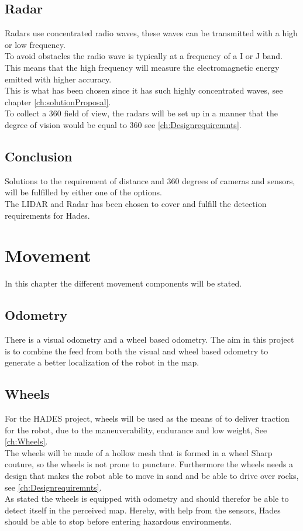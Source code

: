 \section{Radar}
Radars use concentrated radio waves, these waves can be transmitted with a high or low frequency.\\ 
To avoid obstacles the radio wave is typically at a frequency of a I or J band. This means that the high frequency will measure the electromagnetic energy emitted with higher accuracy.\\
This is what has been chosen since it has such highly concentrated waves, see chapter \ref{ch:solutionProposal}.\\
To collect a 360 field of view, the radars will be set up in a manner that the degree of vision would be equal to 360 see \ref{ch:Designrequiremnts}.


\section{Conclusion}
Solutions to the requirement of distance and 360 degrees of cameras and sensors, will be fulfilled by either one of the options.\\
The LIDAR and Radar has been chosen to cover and fulfill the detection requirements for Hades.

\chapter{Movement} \label{ch:MovementHades}

In this chapter the different movement components will be stated.

\section{Odometry}
There is a visual odometry and a wheel based odometry. The aim in this project is to combine the feed from both the visual and wheel based odometry to generate a better localization of the robot in the map.

\section{Wheels}
For the HADES project, wheels will be used as the means of to deliver traction for the robot, due to the maneuverability, endurance and low weight, See \ref{ch:Wheels}.\\
The wheels will be made of a hollow mesh that is formed in a wheel Sharp couture, so the wheels is not prone to puncture. Furthermore the wheels needs a design that makes the robot able to move in sand and be able to drive over rocks, see \ref{ch:Designrequiremnts}. \\
As stated the wheels is equipped with odometry and should therefor be able to detect itself in the perceived map. Hereby, with help from the sensors, Hades should be able to stop before entering hazardous environments.\\

